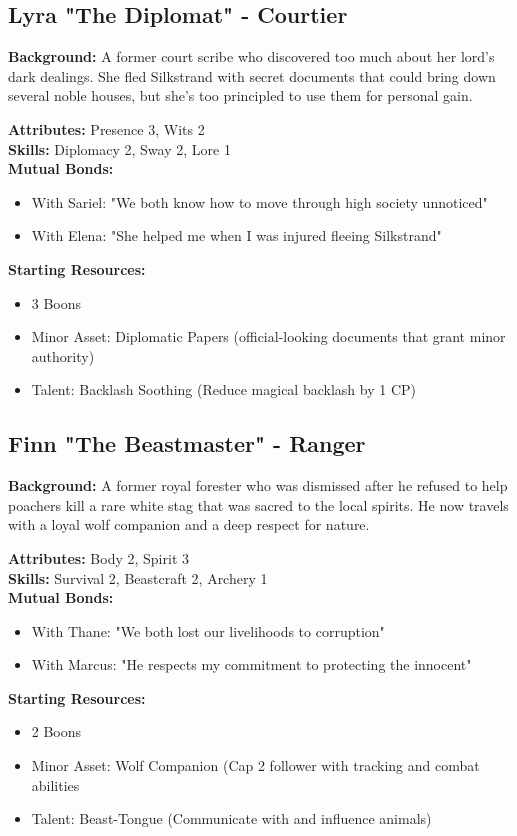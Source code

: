 \documentclass[11pt]{article}
\newenvironment{characterbox}[1]{%
  \begin{mdframed}[backgroundcolor=shadecolor, linewidth=1pt, linecolor=headercolor]%
  \subsection*{#1}%
}{%
  \end{mdframed}%
}
\begin{document}
\begin{characterbox}{Lyra "The Diplomat" - Courtier}
\textbf{Background:} A former court scribe who discovered too much about her lord's dark dealings. She fled Silkstrand with secret documents that could bring down several noble houses, but she's too principled to use them for personal gain.

\textbf{Attributes:} Presence 3, Wits 2 \\
\textbf{Skills:} Diplomacy 2, Sway 2, Lore 1 \\
\textbf{Mutual Bonds:} 
\begin{itemize}
\item With Sariel: "We both know how to move through high society unnoticed"
\item With Elena: "She helped me when I was injured fleeing Silkstrand"
\end{itemize}

\textbf{Starting Resources:}
\begin{itemize}
\item 3 Boons
\item Minor Asset: Diplomatic Papers (official-looking documents that grant minor authority)
\item Talent: Backlash Soothing (Reduce magical backlash by 1 CP)
\end{itemize}
\end{characterbox}

\begin{characterbox}{Finn "The Beastmaster" - Ranger}
\textbf{Background:} A former royal forester who was dismissed after he refused to help poachers kill a rare white stag that was sacred to the local spirits. He now travels with a loyal wolf companion and a deep respect for nature.

\textbf{Attributes:} Body 2, Spirit 3 \\
\textbf{Skills:} Survival 2, Beastcraft 2, Archery 1 \\
\textbf{Mutual Bonds:} 
\begin{itemize}
\item With Thane: "We both lost our livelihoods to corruption"
\item With Marcus: "He respects my commitment to protecting the innocent"
\end{itemize}

\textbf{Starting Resources:}
\begin{itemize}
\item 2 Boons
\item Minor Asset: Wolf Companion (Cap 2 follower with tracking and combat abilities
\item Talent: Beast-Tongue (Communicate with and influence animals)
\end{itemize}
\end{characterbox}
\end{document}
